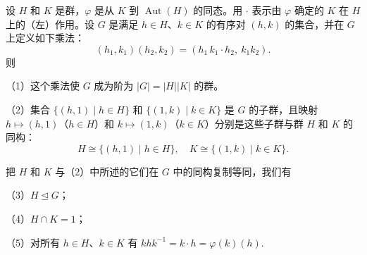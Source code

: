 \begin{theorem}\label{thm:5.10}
设 \(H\) 和 \(K\) 是群，\(\varphi\) 是从 \(K\) 到 \(\operatorname{Aut}(H)\) 的同态。用 \(\cdot\) 表示由 \(\varphi\) 确定的 \(K\) 在 \(H\) 上的（左）作用。设 \(G\) 是满足 \(h \in H\)、\(k \in K\) 的有序对 \((h, k)\) 的集合，并在 \(G\) 上定义如下乘法：
\[
(h_1, k_1)(h_2, k_2) = (h_1\, k_1 \cdot h_2,\ k_1k_2).
\]
则

（1）这个乘法使 \(G\) 成为阶为 \(|G| = |H||K|\) 的群。

（2）集合 \(\{(h, 1) \mid h \in H\}\) 和 \(\{(1, k) \mid k \in K\}\) 是 \(G\) 的子群，且映射 \(h \mapsto (h, 1)\)（\(h \in H\)）和 \(k \mapsto (1, k)\)（\(k \in K\)）分别是这些子群与群 \(H\) 和 \(K\) 的同构：
\[
H \cong \{(h, 1) \mid h \in H\}, \quad K \cong \{(1, k) \mid k \in K\}.
\]

把 \(H\) 和 \(K\) 与（2）中所述的它们在 \(G\) 中的同构复制等同，我们有

（3）\(H \trianglelefteq G\)；

（4）\(H \cap K = 1\)；

（5）对所有 \(h \in H\)、\(k \in K\) 有 \(khk^{-1} = k \cdot h = \varphi(k)(h)\).
\end{theorem}

